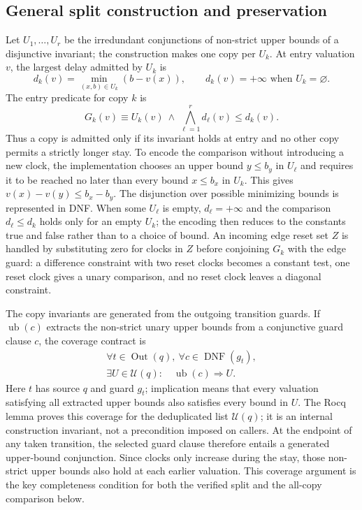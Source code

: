 \subsection{General split construction and preservation}
\label{subsec:split-detail}
Let $U_1,\dots,U_r$ be the irredundant conjunctions of non-strict upper bounds
of a disjunctive invariant; the construction makes one copy per $U_k$. At
entry valuation $v$, the largest delay admitted by $U_k$ is
\[
 d_k(v)=\min_{(x,b)\in U_k}(b-v(x)),
 \qquad d_k(v)=+\infty\text{ when }U_k=\varnothing.
\]
The entry predicate for copy $k$ is
\[
 G_k(v)\equiv U_k(v)\ \land\ \bigwedge_{\ell=1}^{r} d_\ell(v)\le d_k(v).
\]
Thus a copy is admitted only if its invariant holds at entry and no other
copy permits a strictly longer stay. To encode the comparison without
introducing a new clock, the implementation chooses an upper bound
$y\le b_y$ in $U_\ell$ and requires it to be reached no later than every
bound $x\le b_x$ in $U_k$. This gives $v(x)-v(y)\le b_x-b_y$. The
disjunction over possible minimizing bounds is represented in DNF. When some
$U_\ell$ is empty, $d_\ell=+\infty$ and the comparison $d_\ell\le d_k$ holds only for an
empty $U_k$; the encoding then reduces to the constants true and false rather than to a choice of bound. An
incoming edge reset set $Z$ is handled by substituting zero for clocks in
$Z$ before conjoining $G_k$ with the edge guard: a difference constraint
with two reset clocks becomes a constant test, one reset clock gives a unary
comparison, and no reset clock leaves a diagonal constraint.

The copy invariants are generated from the outgoing transition guards. If
$\operatorname{ub}(c)$ extracts the non-strict unary upper bounds from a
conjunctive guard clause $c$, the coverage contract is
\[
\begin{gathered}
\forall t\in\operatorname{Out}(q),\ \forall c\in\operatorname{DNF}(g_t),\\
\exists U\in\mathcal U(q):\quad \operatorname{ub}(c)\Rightarrow U.
\end{gathered}
\]
Here $t$ has source $q$ and guard $g_t$; implication means that every
valuation satisfying all extracted upper bounds also satisfies every bound
in $U$. The Rocq lemma  proves this coverage for
the deduplicated list $\mathcal U(q)$; it is an internal construction
invariant, not a precondition imposed on callers. At the endpoint of any taken
transition, the selected guard clause therefore entails a generated
upper-bound conjunction. Since clocks only increase during the stay, those
non-strict upper bounds also hold at each earlier valuation. This coverage
argument is the key completeness condition for both the verified split and
the all-copy comparison below.

